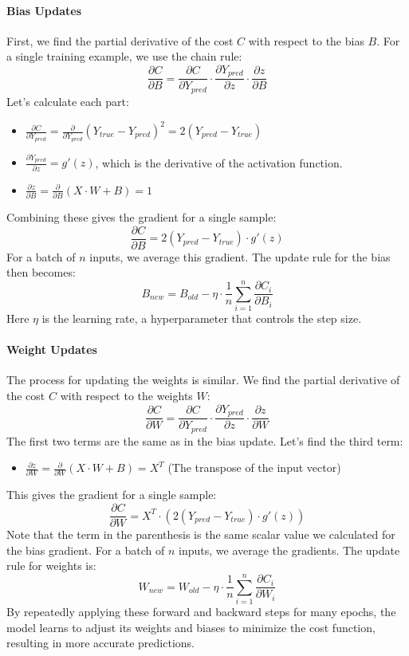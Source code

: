 \documentclass[../main.tex]{subfiles}
\begin{document}
\paragraph{Bias Updates\\}
First, we find the partial derivative of the cost $C$ with respect to the bias $B$. For a single training example, we use the chain rule:
$$
\frac{\partial C}{\partial B} = \frac{\partial C}{\partial Y_{pred}} \cdot \frac{\partial Y_{pred}}{\partial z} \cdot \frac{\partial z}{\partial B}
$$
Let's calculate each part:
\begin{itemize}
    \item $\frac{\partial C}{\partial Y_{pred}} = \frac{\partial}{\partial Y_{pred}} (Y_{true} - Y_{pred})^2 = 2(Y_{pred} - Y_{true})$
    \item $\frac{\partial Y_{pred}}{\partial z} = g'(z)$, which is the derivative of the activation function.
    \item $\frac{\partial z}{\partial B} = \frac{\partial}{\partial B} (X \cdot W + B) = 1$
\end{itemize}
Combining these gives the gradient for a single sample:
$$
\frac{\partial C}{\partial B} = 2(Y_{pred} - Y_{true}) \cdot g'(z)
$$
For a batch of $n$ inputs, we average this gradient. The update rule for the bias then becomes:
$$B_{new} = B_{old} - \eta \cdot \frac{1}{n}\sum_{i = 1}^{n} \frac{\partial C_i}{\partial B_i}$$
Here $\eta$ is the learning rate, a hyperparameter that controls the step size.

\paragraph{Weight Updates\\}
The process for updating the weights is similar. We find the partial derivative of the cost $C$ with respect to the weights $W$:
$$
\frac{\partial C}{\partial W} = \frac{\partial C}{\partial Y_{pred}} \cdot \frac{\partial Y_{pred}}{\partial z} \cdot \frac{\partial z}{\partial W}
$$
The first two terms are the same as in the bias update. Let's find the third term:
\begin{itemize}
    \item $\frac{\partial z}{\partial W} = \frac{\partial}{\partial W} (X \cdot W + B) = X^T$ (The transpose of the input vector)
\end{itemize}
This gives the gradient for a single sample:
$$
\frac{\partial C}{\partial W} = X^T \cdot \left( 2(Y_{pred} - Y_{true}) \cdot g'(z) \right)
$$
Note that the term in the parenthesis is the same scalar value we calculated for the bias gradient. For a batch of $n$ inputs, we average the gradients. The update rule for weights is:
$$W_{new} = W_{old} - \eta \cdot \frac{1}{n}\sum_{i = 1}^{n} \frac{\partial C_i}{\partial W_i}$$
By repeatedly applying these forward and backward steps for many epochs, the model learns to adjust its weights and biases to minimize the cost function, resulting in more accurate predictions.
\end{document}
